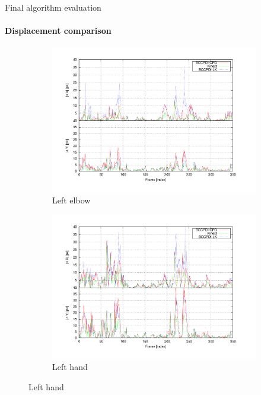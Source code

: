 \begin{frame}[plain]{Final algorithm evaluation}
  \framesubtitle{Displacement comparison}
  \begin{center}
  \begin{figure}
        \centering

        \begin{subfigure}[b]{0.5\columnwidth}
                \centering
                \includegraphics[width=\textwidth, trim=50 40 80 40,clip]{fig27.pdf}
                \caption*{Left elbow}
        \end{subfigure}%
        \begin{subfigure}[b]{0.5\columnwidth}
                \centering
		  \includegraphics[width=\textwidth, trim=50 40 80 40,clip]{fig28.pdf}
                \caption*{Left hand}
        \end{subfigure}%
% 
  \end{figure}
  \end{center}
\end{frame}

